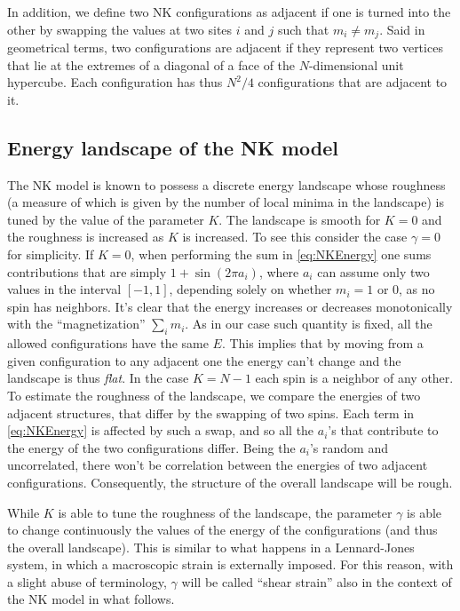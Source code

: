 In addition, we define two NK configurations as adjacent if one is turned into the other by swapping the values at two sites $i$ and $j$ such that $m_{i} \neq m_{j}$. Said in geometrical terms, two configurations are adjacent if they represent two vertices that lie at the extremes of a diagonal of a face of the $N$-dimensional unit hypercube. Each configuration has thus $N^{2}/4$ configurations that are adjacent to it.

\subsection{Energy landscape of the NK model}

The NK model is known to possess a discrete energy landscape whose roughness (a measure of which is given by the number of local minima in the landscape) is tuned by the value of the parameter $K$. The landscape is smooth for $K = 0$ and the roughness is increased as $K$ is increased. To see this consider the case $\gamma = 0$ for simplicity. If $K=0$, when performing the sum in \autoref{eq:NKEnergy} one sums contributions that are simply $1 + \sin(2 \pi a_{i})$, where $a_{i}$ can assume only two values in the interval $[-1,1]$, depending solely on whether $m_{i} = 1 $ or $0$, as no spin has neighbors. It's clear that the energy increases or decreases monotonically with the ``magnetization'' $\sum_{i} m_{i}$. As in our case such quantity is fixed, all the allowed configurations have the same $E$. This implies that by moving from a given configuration to any adjacent one the energy can't change and the landscape is thus \emph{flat}. In the case $K = N-1$ each spin is a neighbor of any other. To estimate the roughness of the landscape, we compare the energies of two adjacent structures, that differ by the swapping of two spins. Each term in \autoref{eq:NKEnergy} is affected by such a swap, and so all the $a_{i}$'s that contribute to the energy of the two configurations differ. Being the $a_{i}$'s random and uncorrelated, there won't be correlation between the energies of two adjacent configurations. Consequently, the structure of the overall landscape will be rough. 

While $K$ is able to tune the roughness of the landscape, the parameter $\gamma$ is able to change continuously the values of the energy of the configurations (and thus the overall landscape). This is similar to what happens in a Lennard-Jones system, in which a macroscopic strain is externally imposed. For this reason, with a slight abuse of terminology, $\gamma$ will be called ``shear strain'' also in the context of the NK model in what follows.

